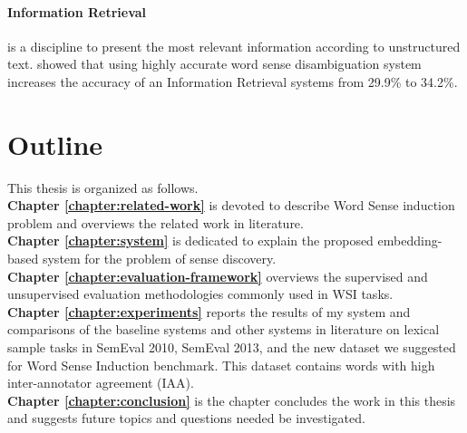 \paragraph{Information Retrieval} is a discipline to present the most relevant information according to unstructured text. \cite{schutze95information} showed that using highly accurate word sense disambiguation system increases the accuracy of an Information Retrieval systems from 29.9\% to
34.2\%.
\section{Outline}

This thesis is organized as follows. \\




\textbf{Chapter \ref{chapter:related-work}} is devoted to describe Word Sense induction problem and overviews the related work in literature. \\


\textbf{Chapter \ref{chapter:system}} is dedicated to explain the proposed embedding-based system for the problem of sense discovery. \\

\textbf{Chapter \ref{chapter:evaluation-framework}} overviews the supervised and unsupervised evaluation methodologies commonly used in WSI tasks. \\


\textbf{Chapter \ref{chapter:experiments}} reports the results of my system and comparisons of the baseline systems and other systems in literature on lexical sample tasks in SemEval 2010, SemEval 2013, and the new dataset we suggested for Word Sense Induction benchmark. This dataset contains words with high inter-annotator agreement (IAA). \\

\textbf{Chapter \ref{chapter:conclusion}} is the chapter concludes the work in this thesis and suggests future topics and questions needed be investigated.
